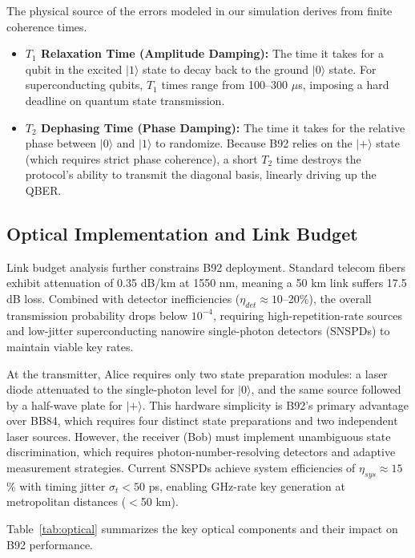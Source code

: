 \documentclass[conference]{IEEEtran}
\begin{document}
The physical source of the errors modeled in our simulation derives from finite coherence times.
\begin{itemize}
    \item \textbf{$T_1$ Relaxation Time (Amplitude Damping):} The time it takes for a qubit in the excited $|1\rangle$ state to decay back to the ground $|0\rangle$ state. For superconducting qubits, $T_1$ times range from 100--300 $\mu$s, imposing a hard deadline on quantum state transmission.
    \item \textbf{$T_2$ Dephasing Time (Phase Damping):} The time it takes for the relative phase between $|0\rangle$ and $|1\rangle$ to randomize. Because B92 relies on the $|+\rangle$ state (which requires strict phase coherence), a short $T_2$ time destroys the protocol's ability to transmit the diagonal basis, linearly driving up the QBER.
\end{itemize}

\subsection{Optical Implementation and Link Budget}
Link budget analysis further constrains B92 deployment. Standard telecom fibers exhibit attenuation of 0.35 dB/km at 1550 nm, meaning a 50 km link suffers 17.5 dB loss. Combined with detector inefficiencies ($\eta_{det} \approx 10$--20\%), the overall transmission probability drops below $10^{-4}$, requiring high-repetition-rate sources and low-jitter superconducting nanowire single-photon detectors (SNSPDs) to maintain viable key rates.

At the transmitter, Alice requires only two state preparation modules: a laser diode attenuated to the single-photon level for $|0\rangle$, and the same source followed by a half-wave plate for $|+\rangle$. This hardware simplicity is B92's primary advantage over BB84, which requires four distinct state preparations and two independent laser sources. However, the receiver (Bob) must implement unambiguous state discrimination, which requires photon-number-resolving detectors and adaptive measurement strategies. Current SNSPDs achieve system efficiencies of $\eta_{sys} \approx 15$\% with timing jitter $\sigma_t < 50$ ps, enabling GHz-rate key generation at metropolitan distances ($<$50 km).

Table~\ref{tab:optical} summarizes the key optical components and their impact on B92 performance.
\end{document}
